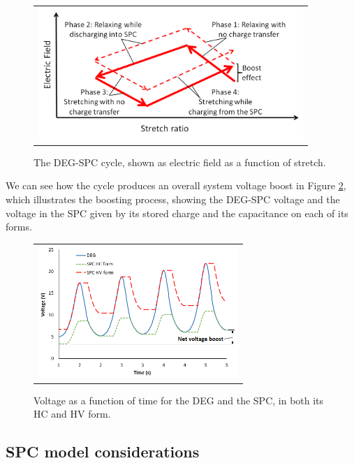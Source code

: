 \begin{figure}[ht]
\begin{center}
\begin{tabular}{c}
\includegraphics[height=5cm]{fig03/SPC_cycle_ph2.png}\\
\end{tabular}
\end{center}
\caption 
{ \label{fig:SPCcycle}
The DEG-SPC cycle, shown as electric field as a function of stretch.} 
\end{figure}

We can see how the cycle produces an overall system voltage boost in Figure \ref{fig:cycles}, which illustrates the boosting process, showing the DEG-SPC voltage and the voltage in the SPC given by its stored charge and the capacitance on each of its forms. 

\begin{figure}[ht]
\begin{center}
\begin{tabular}{c}
\includegraphics[height=5cm]{fig03/Cycles2.png}\\
\end{tabular}
\end{center}
\caption 
{ \label{fig:cycles}
Voltage as a function of time for the DEG and the SPC, in both its HC and HV form.} 
\end{figure}


\subsection{SPC model considerations}
